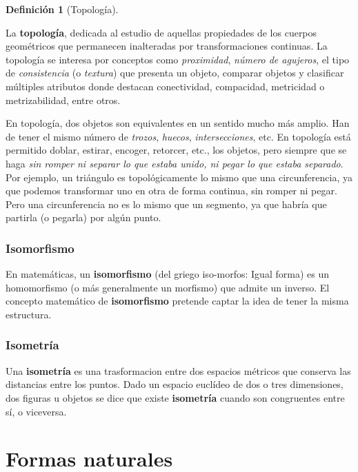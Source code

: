 \documentclass[16pt,]{krantz}
\theoremstyle{definition}
\newtheorem{definition}{Definición}[chapter]
\theoremstyle{definition}
\theoremstyle{definition}
\theoremstyle{definition}
\theoremstyle{remark}
\begin{document}
\begin{definition}[Topología]
\protect\hypertarget{def:topologia}{}{\label{def:topologia} {} }
\end{definition}

La \textbf{topología}, dedicada al estudio de aquellas propiedades de los cuerpos geométricos que permanecen inalteradas por transformaciones continuas. La topología se interesa por conceptos como \emph{proximidad}, \emph{número de agujeros}, el tipo de \emph{consistencia} (o \emph{textura}) que presenta un objeto, comparar objetos y clasificar múltiples atributos donde destacan conectividad, compacidad, metricidad o metrizabilidad, entre otros.

En topología, dos objetos son equivalentes en un sentido mucho más amplio. Han de tener el mismo número de \emph{trozos}, \emph{huecos}, \emph{intersecciones}, etc. En topología está permitido doblar, estirar, encoger, retorcer, etc., los objetos, pero siempre que se haga \emph{sin romper ni separar lo que estaba unido, ni pegar lo que estaba separado}. Por ejemplo, un triángulo es topológicamente lo mismo que una circunferencia, ya que podemos transformar uno en otra de forma continua, sin romper ni pegar. Pero una circunferencia no es lo mismo que un segmento, ya que habría que partirla (o pegarla) por algún punto.

\hypertarget{isomorfismo}{%
\subsection{Isomorfismo}\label{isomorfismo}}

En matemáticas, un \textbf{isomorfismo} (del griego iso-morfos: Igual forma) es un homomorfismo (o más generalmente un morfismo) que admite un inverso. El concepto matemático de \textbf{isomorfismo} pretende captar la idea de tener la misma estructura.

\hypertarget{isometruxeda}{%
\subsection{Isometría}\label{isometruxeda}}

Una \textbf{isometría} es una trasformacion entre dos espacios métricos que conserva las distancias entre los puntos. Dado un espacio euclídeo de dos o tres dimensiones, dos figuras u objetos se dice que existe \textbf{isometría} cuando son congruentes entre sí, o viceversa.

\hypertarget{formas-naturales}{%
\chapter{Formas naturales}\label{formas-naturales}}
\end{document}
